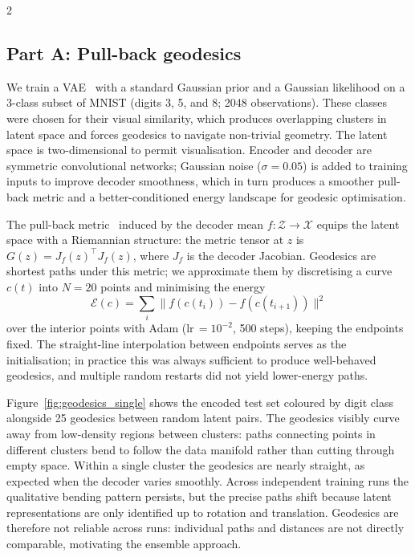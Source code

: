 \documentclass[10pt,a4paper]{article}
\begin{document}
\begin{multicols}{2}

\subsection*{Part A: Pull-back geodesics}

We train a VAE~\citep{kingma2013vae} with a standard Gaussian prior
and a Gaussian likelihood on a 3-class subset of MNIST (digits 3, 5,
and 8; 2048 observations). These classes were chosen for their visual
similarity, which produces overlapping clusters in latent space and
forces geodesics to navigate non-trivial geometry. The latent space
is two-dimensional to permit visualisation. Encoder and decoder are
symmetric convolutional networks; Gaussian noise ($\sigma\!=\!0.05$)
is added to training inputs to improve decoder smoothness, which in
turn produces a smoother pull-back metric and a better-conditioned
energy landscape for geodesic optimisation.

The pull-back metric~\citep{arvanitidis2018latent} induced by the
decoder mean $f\colon\mathcal{Z}\to\mathcal{X}$ equips the latent
space with a Riemannian structure: the metric tensor at $z$ is
$G(z) = J_f(z)^\top J_f(z)$, where $J_f$ is the decoder Jacobian.
Geodesics are shortest paths under this metric; we approximate
them by discretising a curve $c(t)$ into $N\!=\!20$ points and
minimising the energy
\begin{equation}
    \mathcal{E}(c) = \sum_{i} \lVert f(c(t_i)) - f(c(t_{i+1})) \rVert^2
\end{equation}
over the interior points with Adam (lr\,$=10^{-2}$, 500 steps),
keeping the endpoints fixed. The straight-line interpolation between
endpoints serves as the initialisation; in practice this was always
sufficient to produce well-behaved geodesics, and multiple random
restarts did not yield lower-energy paths.

Figure~\ref{fig:geodesics_single} shows the encoded test set coloured
by digit class alongside 25 geodesics between random latent pairs.
The geodesics visibly curve away from low-density regions between
clusters: paths connecting points in different clusters bend to
follow the data manifold rather than cutting through empty space.
Within a single cluster the geodesics are nearly straight, as
expected when the decoder varies smoothly.
Across independent training runs the qualitative bending pattern
persists, but the precise paths shift because latent
representations are only identified up to rotation and
translation. Geodesics are therefore not reliable across runs:
individual paths and distances are not directly comparable,
motivating the ensemble approach.


\end{multicols}
\end{document}
